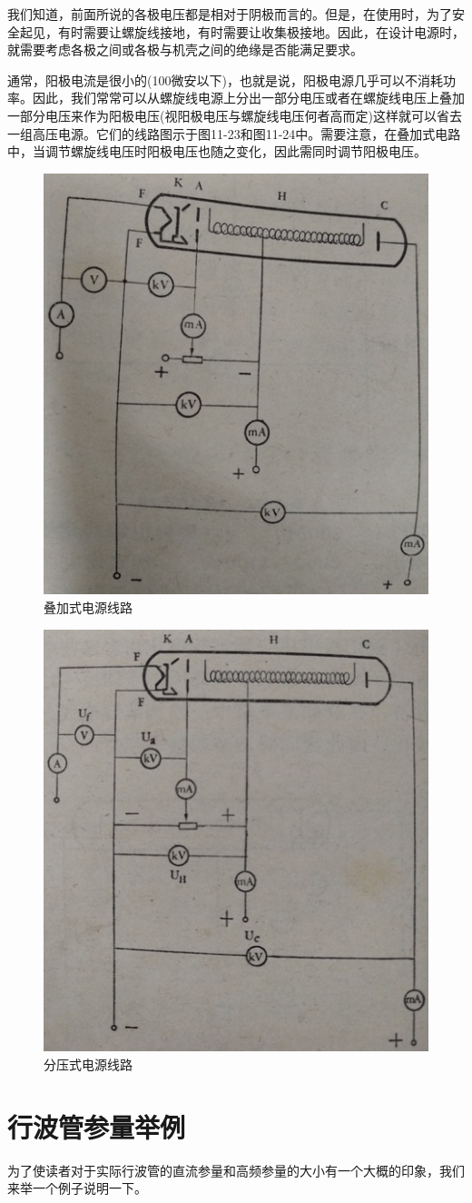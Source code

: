 我们知道，前面所说的各极电压都是相对于阴极而言的。但是，在使用时，为了安全起见，有时需要让螺旋线接地，有时需要让收集极接地。因此，在设计电源时，就需要考虑各极之间或各极与机壳之间的绝缘是否能满足要求。


通常，阳极电流是很小的(100微安以下)，也就是说，阳极电源几乎可以不消耗功率。因此，我们常常可以从螺旋线电源上分出一部分电压或者在螺旋线电压上叠加一部分电压来作为阳极电压(视阳极电压与螺旋线电压何者高而定)这样就可以省去一组高压电源。它们的线路图示于图11-23和图11-24中。需要注意，在叠加式电路中，当调节螺旋线电压时阳极电压也随之变化，因此需同时调节阳极电压。

\begin{figure}[phtb]
	\centering
	\includegraphics[width=0.52\linewidth]{figure/ch11-23}
	\caption{叠加式电源线路}
	\label{ch11-23}
\end{figure}

\begin{figure}[phtb]
	\centering
	\includegraphics[width=0.52\linewidth]{figure/ch11-24}
	\caption{分压式电源线路}
	\label{ch11-24}
\end{figure}
\section{行波管参量举例}
为了使读者对于实际行波管的直流参量和高频参量的大小有一个大概的印象，我们来举一个例子说明一下。

